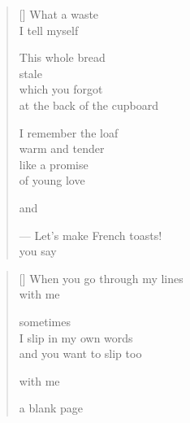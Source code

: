 \documentclass[12pt,a4paper]{article}
\begin{document}

\newpage

\poemtitle{}

\settowidth{\versewidth}{--- Let's make French toasts!}

\bigskip

\begin{verse}[\versewidth]
  What a waste \\
  I tell myself

  This whole bread \\
  stale \\
  which you forgot \\
  at the back of the cupboard

  I remember the loaf \\
  warm and tender \\
  like a promise \\
  of young love

  and

  --- Let's make French toasts! \\
  you say
\end{verse}


\newpage

\poemtitle{}

\settowidth{\versewidth}{When you go through my lines}

\bigskip

\begin{verse}[\versewidth]
  When you go through my lines \\
  with me

  sometimes \\
  I slip in my own words \\
  and you want to slip too

  with me

  a blank page
\end{verse}


\newpage

\poemtitle{}

\settowidth{\versewidth}{to the clear waters}

\bigskip
\end{document}
